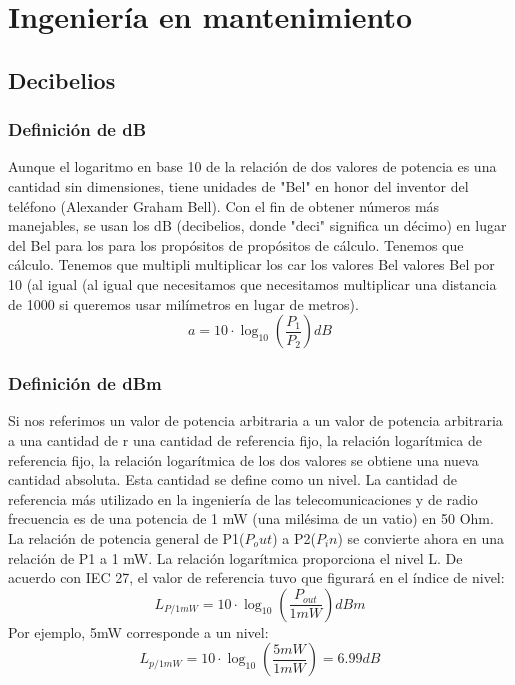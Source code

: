 \documentclass[
	12pt, %
	fleqn, %
	a4paper, %
]{LegrandOrangeBook}
\begin{document}
\part{Ingeniería en mantenimiento}
\chapter{Decibelios}\label{chap:decibelios}
\section{Definición de dB}
Aunque el logaritmo en base 10 de la relación de dos valores de potencia es una cantidad sin dimensiones, tiene unidades de "Bel" en honor del inventor del teléfono (Alexander Graham Bell). Con el fin de obtener números más manejables, se usan los dB (decibelios, donde "deci" significa un décimo) en lugar del Bel  para los  para los propósitos de propósitos de cálculo. Tenemos que cálculo. Tenemos que multipli multiplicar los car los valores Bel valores Bel por 10 (al igual (al igual que necesitamos que necesitamos multiplicar una distancia de 1000 si queremos usar milímetros en lugar de metros).
\begin{equation}
\label{art:decibel}
a=10\cdot \log_{10}\left(\frac{P_1}{P_2}\right)dB
\end{equation}
\section{Definición de dBm}
Si nos referimos un valor de potencia arbitraria a un valor de potencia arbitraria a una cantidad de r una cantidad de referencia fijo, la relación logarítmica de referencia fijo, la relación logarítmica de los dos valores se obtiene una nueva cantidad absoluta. Esta cantidad se define como un nivel. La cantidad de referencia más utilizado en la ingeniería de las telecomunicaciones y de radio frecuencia es de una potencia de 1 mW (una milésima de un vatio) en 50 Ohm. La relación de potencia general de P1($P_out$) a P2($P_in$) se convierte ahora en una relación de P1 a 1 mW. La relación logarítmica proporciona el nivel L. De acuerdo con IEC 27, el valor de referencia tuvo que figurará en el índice de nivel:
\begin{equation}\label{art:def dbm}
L_{P/1mW}=10\cdot \log_{10}\left(\frac{P_{out}}{1mW}\right)dBm
\end{equation}
Por ejemplo, 5mW corresponde a un nivel:
\begin{displaymath}
L_{p/1mW}=10\cdot \log_{10}\left(\frac{5mW}{1mW}\right)=6.99dB
\end{displaymath}
\end{document}
